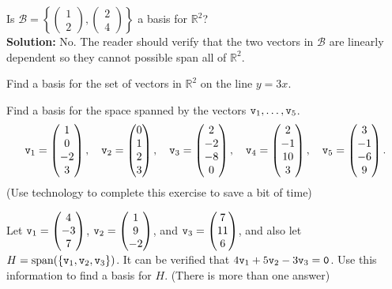 \begin{example}
Is $\mathcal{B} = \left\{ \begin{pmatrix} 1\\2\end{pmatrix} , \begin{pmatrix}
    2\\4\end{pmatrix} \right\}$ a basis for $\mathbb{R}^2$?
\\{\bf Solution:}
No. The reader should verify that the two vectors in $\mathcal{B}$ are linearly dependent
so they cannot possible span all of $\mathbb{R}^2$.
\end{example}

% 
% 
\begin{problem}
\ba
    \item Find a basis for the set of vectors in $\mathbb{R}^2$ on the line $y=3x$.
    \item Find a basis for the space spanned by the vectors $\texttt{v}_1, \dots, \texttt{v}_5$.
        \[ \texttt{v}_1 = \begin{pmatrix} 1\\0\\-2\\3\end{pmatrix}, \quad \texttt{v}_2 = \begin{pmatrix} 0\\1\\2\\3\end{pmatrix}, \quad \texttt{v}_3 =
            \begin{pmatrix} 2\\-2\\-8\\0\end{pmatrix}, \quad \texttt{v}_4=\begin{pmatrix}2\\-1\\10\\3\end{pmatrix}, \quad \texttt{v}_5=\begin{pmatrix}
        3\\-1\\-6\\9\end{pmatrix}.\]
        (Use technology to complete this exercise to save a bit of time)
    \item Let $\texttt{v}_1 = \begin{pmatrix}4\\-3\\7\end{pmatrix}$, $\texttt{v}_2=\begin{pmatrix} 1\\9\\-2\end{pmatrix}$, and $\texttt{v}_3=\begin{pmatrix}
        7\\11\\6\end{pmatrix}$, and also let $H = \text{span}(\{\texttt{v}_1,\texttt{v}_2,\texttt{v}_3\})$.  It can be
        verified that $4\texttt{v}_1 + 5\texttt{v}_2 - 3\texttt{v}_3 = \texttt{0}$.  Use this information to find a
        basis for $H$.  (There is more than one answer)
\ea

\end{problem}


